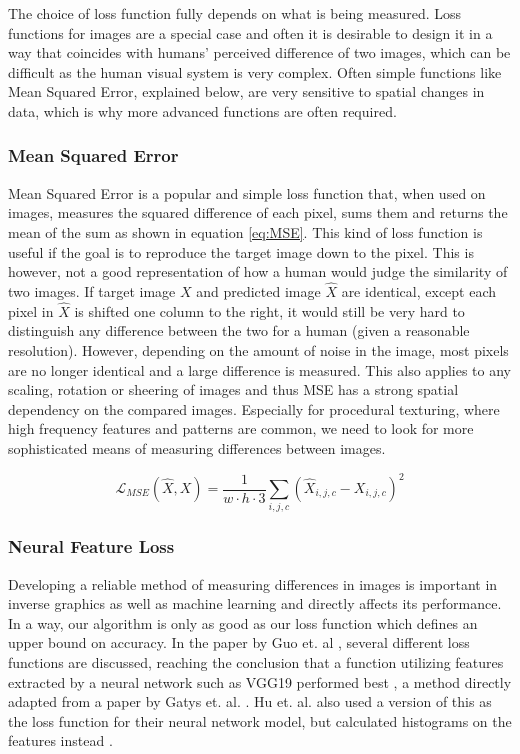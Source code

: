 The choice of loss function fully depends on what is being measured. Loss functions for images are a special case and often it is desirable to design it in a way that coincides with humans' perceived difference of two images, which can be difficult as the human visual system is very complex. Often simple functions like Mean Squared Error, explained below, are very sensitive to spatial changes in data, which is why more advanced functions are often required.

\subsubsection{Mean Squared Error}\label{sec:MeanSquaredError}

Mean Squared Error is a popular and simple loss function that, when used on images, measures the squared difference of each pixel, sums them and returns the mean of the sum as shown in equation \ref{eq:MSE}. This kind of loss function is useful if the goal is to reproduce the target image down to the pixel. This is however, not a good representation of how a human would judge the similarity of two images. If target image $X$ and predicted image $\hat{X}$ are identical, except each pixel in $\hat{X}$ is shifted one column to the right, it would still be very hard to distinguish any difference between the two for a human (given a reasonable resolution). However, depending on the amount of noise in the image, most pixels are no longer identical and a large difference is measured. This also applies to any scaling, rotation or sheering of images and thus MSE has a strong spatial dependency on the compared images. Especially for procedural texturing, where high frequency features and patterns are common, we need to look for more sophisticated means of measuring differences between images.

\begin{equation}\label{eq:MSE}
    \mathcal{L}_{MSE}(\hat{X}, X) = \frac{1}{w\cdot h\cdot 3}\sum_{i,j,c} (\hat{X}_{i,j,c} - X_{i,j,c})^2
\end{equation}

\subsubsection{Neural Feature Loss}\label{sec:NeuralFeatureLoss}

Developing a reliable method of measuring differences in images is important in inverse graphics as well as machine learning and directly affects its performance. In a way, our algorithm is only as good as our loss function which defines an upper bound on accuracy. In the paper by Guo et. al \cite{guo_2019_a}, several different loss functions are discussed, reaching the conclusion that a function utilizing features extracted by a neural network such as VGG19 performed best \cite{simonyan_2015_very}, a method directly adapted from a paper by Gatys et. al. \cite{gatys_2015_texture}. Hu et. al. also used a version of this as the loss function for their neural network model, but calculated histograms on the features instead \cite{hu_2019_a}.

